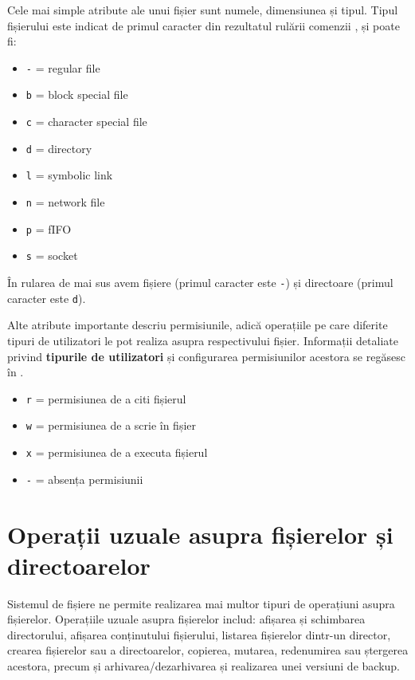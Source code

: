 Cele mai simple atribute ale unui fișier sunt numele, dimensiunea și tipul.
Tipul fișierului este indicat de primul caracter din rezultatul rulării comenzii
, și poate fi:

\begin{itemize}
	\item \texttt{-} = regular file
	\item \texttt{b} = block special file
	\item \texttt{c} = character special file
	\item \texttt{d} = directory
	\item \texttt{l} = symbolic link
	\item \texttt{n} = network file
	\item \texttt{p} = fIFO
	\item \texttt{s} = socket
\end{itemize}

În rularea de mai sus avem fișiere (primul caracter este \texttt{-}) și directoare (primul caracter este \texttt{d}).

Alte atribute importante descriu permisiunile, adică operațiile pe care diferite
tipuri de utilizatori le pot realiza asupra respectivului fișier. Informații
detaliate privind \textbf{tipurile de utilizatori} și configurarea permisiunilor
acestora se regăsesc în .

\begin{itemize}
	\item \texttt{r} = permisiunea de a citi fișierul
	\item \texttt{w} = permisiunea de a scrie în fișier
	\item \texttt{x} = permisiunea de a executa fișierul
	\item \texttt{-} = absența permisiunii
\end{itemize}

\section{Operații uzuale asupra fișierelor și directoarelor}
\label{sec:file-system-file-ops}

Sistemul de fișiere ne permite realizarea mai multor tipuri de operațiuni asupra
fișierelor. Operațiile uzuale asupra fișierelor includ: afișarea și
schimbarea directorului, afișarea conținutului fișierului, listarea fișierelor
dintr-un director, crearea fișierelor sau a directoarelor, copierea, mutarea,
redenumirea sau ștergerea acestora, precum și arhivarea/dezarhivarea și
realizarea unei versiuni de backup.

